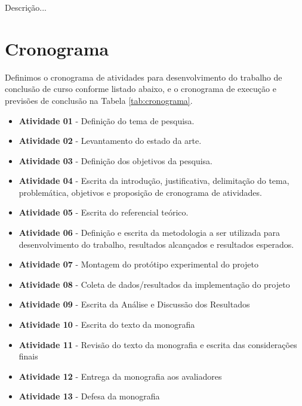Descrição...

\section{Cronograma}


Definimos o cronograma de atividades para desenvolvimento do trabalho de conclusão de curso conforme listado abaixo, e o cronograma de execução e previsões de conclusão na Tabela \ref{tab:cronograma}.

\begin{itemize}
    \item \textbf{Atividade 01} - Definição do tema de pesquisa.
    
    \item \textbf{Atividade 02} - Levantamento do estado da arte.
   
    \item \textbf{Atividade 03} - Definição dos objetivos da pesquisa.
    
    \item \textbf{Atividade 04} - Escrita da introdução, justificativa, delimitação do tema, problemática, objetivos e proposição de cronograma de atividades.
    
    \item \textbf{Atividade 05} - Escrita do referencial teórico.
    
    \item \textbf{Atividade 06} - Definição e escrita da metodologia a ser utilizada para desenvolvimento do trabalho, resultados alcançados e  resultados esperados.
    
    \item \textbf{Atividade 07} - Montagem do protótipo experimental do projeto
    
    \item \textbf{Atividade 08} - Coleta de dados/resultados da implementação do projeto
    
    \item \textbf{Atividade 09} - Escrita da Análise e Discussão dos Resultados
    
    \item \textbf{Atividade 10} - Escrita do texto da monografia
    
    \item \textbf{Atividade 11} - Revisão do texto da monografia e escrita das considerações finais
    
    \item \textbf{Atividade 12} - Entrega da monografia aos avaliadores
    
    \item \textbf{Atividade 13} - Defesa da monografia
    
\end{itemize}

